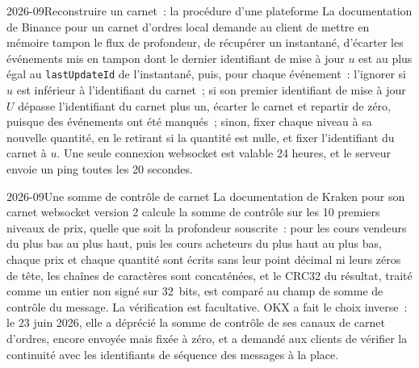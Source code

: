 \begin{dated}{2026-09}{Reconstruire un carnet~: la procédure d'une plateforme}\label{dat:m3:crypto-data-and-infrastructure:binance}
La documentation de Binance pour un carnet d'ordres local demande au client de mettre en mémoire tampon le flux de profondeur, de récupérer un instantané, d'écarter les événements mis en tampon
dont le dernier identifiant de mise à jour $u$ est au plus égal au \texttt{lastUpdateId} de l'instantané, puis, pour chaque événement~: l'ignorer si $u$ est inférieur à l'identifiant du carnet~;
si son premier identifiant de mise à jour $U$ dépasse l'identifiant du carnet plus un, écarter le carnet et repartir de zéro, puisque des événements ont été manqués~; sinon, fixer chaque niveau à
sa nouvelle quantité, en le retirant si la quantité est nulle, et fixer l'identifiant du carnet à $u$. Une seule connexion websocket est valable 24 heures, et le
serveur envoie un ping toutes les 20 secondes.
\end{dated}

\begin{dated}{2026-09}{Une somme de contrôle de carnet}\label{dat:m3:crypto-data-and-infrastructure:kraken}
La documentation de Kraken pour son carnet websocket version 2 calcule la somme de contrôle sur les 10 premiers niveaux de prix, quelle que soit la profondeur souscrite~: pour les cours vendeurs
du plus bas au plus haut, puis les cours acheteurs du plus haut au plus bas, chaque prix et chaque quantité sont écrits sans leur point décimal ni leurs zéros de tête, les chaînes de caractères sont
concaténées, et le CRC32 du résultat, traité comme un entier non signé sur 32~bits, est comparé au champ de somme de contrôle du message. La vérification est facultative.
OKX a fait le choix inverse~: le 23 juin 2026, elle a déprécié la somme de contrôle de ses canaux de carnet d'ordres, encore envoyée mais fixée à zéro, et a demandé aux clients de vérifier
la continuité avec les identifiants de séquence des messages à la place.
\end{dated}

